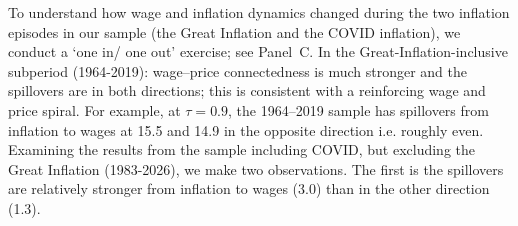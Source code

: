 \documentclass{article}
\begin{document}


To understand how wage and inflation dynamics changed during the two inflation episodes in our sample (the Great Inflation and the COVID inflation), we conduct a `one in/ one out' exercise; see Panel~C.     In the
Great-Inflation-inclusive subperiod (1964-2019): wage--price connectedness is much stronger and the spillovers are in both directions; this is consistent with a reinforcing wage and price spiral.  For example, at $\tau=0.9$, the 1964–2019 sample has spillovers from inflation to wages at 15.5 and 14.9 in the opposite direction i.e. roughly even.  Examining the results from the sample including COVID, but excluding the Great Inflation (1983-2026), we make two observations. The first is the spillovers are relatively stronger from inflation to wages (3.0) than in the other direction (1.3). 
\end{document}
